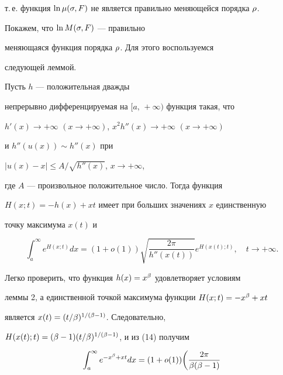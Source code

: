 \begin{pf}
т.\,е. функция $\ln\mu(\sigma,F)$ не является правильно меняющейся порядка $\rho$. 





Покажем, что $\ln M(\sigma,F)$ --- правильно


меняющаяся функция порядка $\rho$. Для этого воспользуемся


следующей леммой.





\begin{lem}


Пусть $h$ --- положительная дважды


непрерывно дифференцируемая на $[a,\,+\infty)$ функция такая, что


$h'(x)\to+\infty$ $(x\to+\infty)$, $x^2h''(x)\to+\infty$ $(x\to+\infty)$


и $h''(u(x))\sim h''(x)$ при 


$|u(x)-x|\le A/\sqrt{h''(x)}$, $x\to+\infty$,


где $A$ --- произвольное положительное число. Тогда функция


$H(x;t)=-h(x)+xt$ имеет при больших значениях $x$ единственную


точку максимума $x(t)$ и


\begin{equation}


\int_{a}^{\infty}e^{H(x;t)}dx=


(1+o(1))\sqrt{\frac{2\pi}{h''(x(t))}}e^{H(x(t);t)},\quad


t\to+\infty.


\end{equation}


\end{lem}





Легко проверить, что функция $h(x)=x^\beta$ удовлетворяет условиям


леммы 2, а единственной точкой максимума функции $H(x;t)=-x^\beta+xt$


является $x(t)=(t/\beta)^{1/(\beta-1)}$. Следовательно,


$H(x(t);t)=(\beta-1)(t/\beta)^{1/(\beta-1)}$, и из (14) получим


\begin{multline*}


\int_a^\i e^{-x^\be+xt}dx=


(1+o(1))\biggl(\frac{2\pi}{\be(\be-1)}



\end{multline*}
\end{pf}

